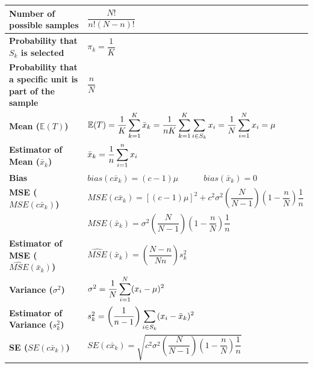 \renewcommand{\arraystretch}{2.5}
\begin{longtable}{|p{5cm}|p{9cm}|}
    \hline\endfirsthead
    \hline\endhead
    \hline\endfoot
    \hline\endlastfoot

    \textbf{Number of possible samples} & \( \dfrac{N!}{n!(N-n)!} \) \\
    \hline

    \textbf{Probability that $S_k$ is selected} & $\pi_k = \dfrac{1}{K}$ \\
    \hline

    \textbf{Probability that a specific unit is part of the sample} & $\dfrac{n}{N}$ \\
    \hline

    \textbf{Mean ($\mathbb{E}(T)$)} & $
        \mathbb{E}(T) = 
        \dfrac{1}{K} \displaystyle\sum_{k=1}^{K}
        \bar{x}_k 
        =
        \dfrac{1}{nK} \displaystyle\sum_{k=1}^{K}
        \displaystyle\sum_{i \in S_k} x_i
        =
        \dfrac{1}{N} \displaystyle\sum_{i=1}^{N} x_i
        = \mu
    $ \\[2ex]
    \hline

    \textbf{Estimator of Mean ($\bar{x}_k$)} & $
        \bar{x}_k=
        \dfrac{1}{n} \displaystyle\sum_{i=1}^{n} x_i
    $ \\[2ex]
    \hline

    \textbf{Bias} & $
        bias(c\bar{x}_k) = (c-1)\mu
        \quad\quad\quad
        bias(\bar{x}_k) = 0
    $ \\[1ex]
    \hline

    \textbf{MSE ($MSE(c\bar{x}_k)$)} & $
        MSE(c\bar{x}_k) 
        = [(c-1)\mu]^2 +
        c^2 \sigma^2 \left(\dfrac{N}{N-1} \right)\left( 1-\dfrac{n}{N} \right)\dfrac{1}{n}
    $\\[1ex]
    & $MSE(\bar{x}_k) 
        = \sigma^2 \left(\dfrac{N}{N-1} \right)\left( 1-\dfrac{n}{N} \right)\dfrac{1}{n}$ \\[1ex]
    \hline

    \textbf{Estimator of MSE ($\hat{MSE}(\bar{x}_k)$)} & $
        \hat{MSE}(\bar{x}_k) = \left(\dfrac{N-n}{Nn} \right)s_k^2
    $\\[1ex]
    \hline

    \textbf{Variance ($\sigma^2$)} & $
        \sigma^2 = \dfrac{1}{N} \displaystyle\sum_{i=1}^{N}
        (x_i - \mu)^2
    $\\[1ex]
    \hline

    \textbf{Estimator of Variance ($s_k^2$)} & $
        s_k^2 = \left(\dfrac{1}{n-1}\right) \displaystyle\sum_{i\in S_k}
        (x_i - \bar{x}_k)^2
    $\\[1ex]
    \hline

    \textbf{SE ($SE(c\bar{x}_k)$)} & $
        SE(c\bar{x}_k) = \sqrt{
            c^2 \sigma^2 \left(\dfrac{N}{N-1} \right)\left( 1-\dfrac{n}{N} \right)\dfrac{1}{n}
        }
    $\\[1ex]
    \hline
\end{longtable}

